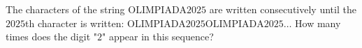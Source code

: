 The characters of the string $\text{OLIMPIADA2025}$ are written consecutively until the $2025$th character is written: $\text{OLIMPIADA2025OLIMPIADA2025}\ldots$ How many times does the digit "$2$" appear in this sequence?

